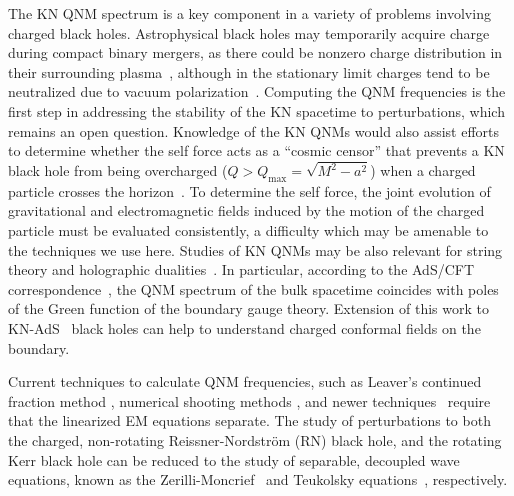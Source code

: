 \begin{refsection}
The KN QNM spectrum is a key component in a variety of problems involving charged black holes. Astrophysical black holes may temporarily acquire charge during compact binary mergers, as there could be nonzero charge distribution in their surrounding plasma~\cite{Alic2012,Lehner2012}, although in the stationary limit charges tend to be neutralized due to vacuum polarization~\cite{Gibbons75}. 
Computing the QNM frequencies is the first step in addressing the stability of the KN spacetime to perturbations, which remains an open question.
Knowledge of the KN QNMs would also assist efforts to determine whether the self force acts as a ``cosmic censor'' that prevents a KN black hole from being overcharged ($Q>Q_\text{max}=\sqrt{M^2-a^2}$) when a charged particle crosses the horizon~\cite{ZimmermanPoisson}. To determine the self force, the joint evolution of gravitational and electromagnetic fields induced by the motion of the charged particle 
must be evaluated consistently, a difficulty which may be amenable to the techniques we use here.
Studies of KN QNMs may be also relevant for string theory and holographic dualities~\cite{Berti2009}. In particular, according to the AdS/CFT correspondence~\cite{Maldacena:1997re}, the QNM spectrum of the bulk spacetime coincides with poles of the Green function of the boundary gauge theory. Extension of this work to KN-AdS~\cite{Caldarelli:1999xj} black holes can help to understand charged conformal fields on the boundary.

Current techniques to calculate QNM frequencies, such as Leaver's continued fraction method \cite{Leaver1985}, numerical shooting methods \cite{PressTeukolsky1973}, and newer techniques~\cite{Pani2013PHYSD,Pani:2013pma} require that the linearized EM equations separate.
The study of perturbations to both the charged, non-rotating Reissner-Nordstr\"{o}m (RN) black hole, and the rotating Kerr black hole can be reduced to the study of separable, decoupled wave equations, known as  the Zerilli-Moncrief~\cite{Zerilli1974,Moncrief1974odd,Moncrief1974even} and Teukolsky equations~\cite{Teukolsky1973,PressTeukolsky1973,TeukolskyPress1974}, respectively. 


\end{refsection}
